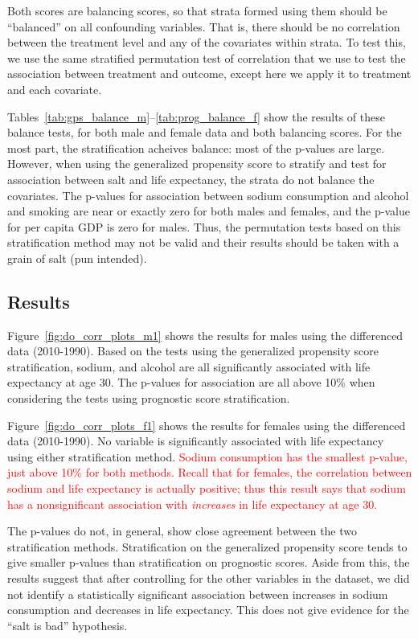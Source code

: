 \documentclass[11pt]{article}\usepackage[]{graphicx}\usepackage[]{color}
\begin{document}
Both scores are balancing scores, so that strata formed using them should be ``balanced'' on all confounding variables.
That is, there should be no correlation between the treatment level and any of the covariates within strata.
To test this, we use the same stratified permutation test of correlation that we use to test the association between treatment and outcome, except here we apply it to treatment and each covariate.

Tables~\ref{tab:gps_balance_m}--\ref{tab:prog_balance_f} show the results of these balance tests, for both male and female data and both balancing scores.
For the most part, the stratification acheives balance: most of the p-values are large.
However, when using the generalized propensity score to stratify and test for association between salt and life expectancy, the strata do not balance the covariates.
The p-values for association between sodium consumption and alcohol and smoking are near or exactly zero for both males and females, and the p-value for per capita GDP is zero for males.
Thus, the permutation tests based on this stratification method may not be valid and their results should be taken with a grain of salt (pun intended).

\subsection{Results}
Figure~\ref{fig:do_corr_plots_m1} shows the results for males using the differenced data (2010-1990).
Based on the tests using the generalized propensity score stratification, sodium, and alcohol are all significantly associated with life expectancy at age 30.
The p-values for association are all above 10\% when considering the tests using prognostic score stratification.

Figure~\ref{fig:do_corr_plots_f1} shows the results for females using the differenced data (2010-1990).
No variable is significantly associated with life expectancy using either stratification method.
\textcolor{red}{Sodium consumption has the smallest p-value, just above 10\% for both methods.
Recall that for females, the correlation between sodium and life expectancy is actually positive; thus this result says that sodium has a nonsignificant association with \textit{increases} in life expectancy at age 30.
}

The p-values do not, in general, show close agreement between the two stratification methods.
Stratification on the generalized propensity score tends to give smaller p-values than stratification on prognostic scores.
Aside from this, the results suggest that after controlling for the other variables in the dataset, we did not identify a statistically significant association between increases in sodium consumption and decreases in life expectancy.
This does not give evidence for the ``salt is bad'' hypothesis.
\end{document}
